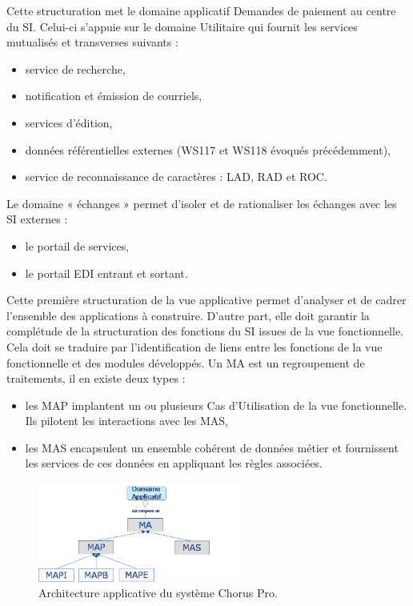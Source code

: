 \documentclass[12pt,a4paper]{article}
\begin{document}
\newpage
Cette structuration met le domaine applicatif Demandes de paiement au centre du \gls{SI}. Celui-ci s’appuie sur le domaine Utilitaire qui fournit les services mutualisés et transverses suivants :
\smallbreak
\begin{itemize}
\item	service de recherche,
\item	notification et émission de courriels,
\item	services d'édition,
\item	données référentielles externes (WS117 et WS118 évoqués précédemment),
\item	service de reconnaissance de caractères : \gls{LAD}, \gls{RAD} et \gls{ROC}.
\end{itemize}
\medbreak
Le domaine « échanges » permet d’isoler et de rationaliser les échanges avec les \gls{SI} externes :
\smallbreak
\begin{itemize}
\item	le portail de services,
\item	le portail EDI entrant et sortant.
\end{itemize}
\medbreak
Cette première structuration de la vue applicative permet d’analyser et de cadrer l’ensemble des applications à construire. D’autre part, elle doit garantir la complétude de la structuration des fonctions du \gls{SI} issues de la vue fonctionnelle. Cela doit se traduire par l’identification de liens entre les fonctions de la vue fonctionnelle et des modules développés.
\smallbreak
Un \gls{MA} est un regroupement de traitements, il en existe deux types :
\begin{itemize}
\item les \gls{MAP} implantent un ou plusieurs Cas d’Utilisation de la vue fonctionnelle. Ils pilotent les interactions avec les \gls{MAS},
\item les MAS encapsulent un ensemble cohérent de données métier et fournissent les services de ces données en appliquant les règles associées.
\end{itemize}
\begin{figure}[H]
	\begin{center}
		\includegraphics[width=0.6\textwidth, keepaspectratio]{archiApplicative.png}
		\caption{Architecture applicative du système Chorus Pro.}
	\end{center}
\end{figure}
\clearpage
\newpage
\end{document}
